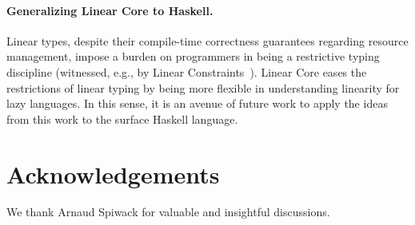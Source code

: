 \documentclass[acmsmall,review,anonymous,screen]{acmart}
\begin{document}
\paragraph{Generalizing Linear Core to Haskell.}
Linear types, despite their compile-time correctness guarantees regarding
resource management, impose a burden on programmers in being a restrictive
typing discipline (witnessed, e.g., by Linear
Constraints~\cite{cite:linearconstraints}). Linear Core eases the restrictions
of linear typing by being more flexible in understanding linearity for lazy
languages. In this sense, it is an avenue of future
work to apply the ideas from this work to the surface Haskell language.

\section*{Acknowledgements}

We thank Arnaud Spiwack for valuable and insightful discussions.

% 
% 
% 
% 
% 
% 
% 
% 
% 
\end{document}
